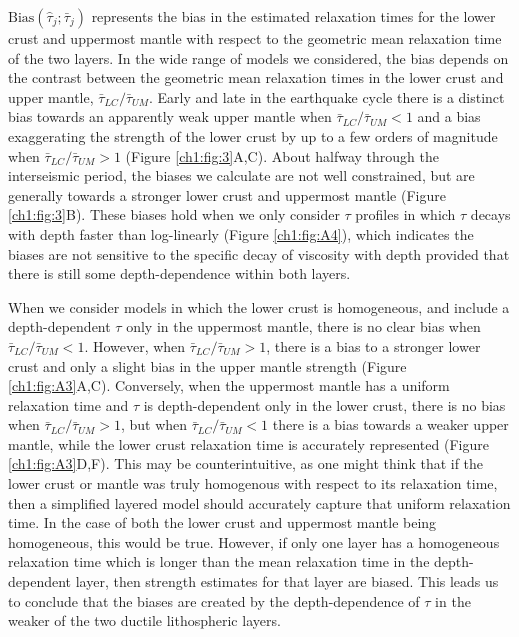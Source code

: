 $\mathrm{Bias}(\hat{\tau}_j; \bar{\tau}_j)$ represents the bias in the
estimated relaxation times for the lower crust and uppermost mantle
with respect to the geometric mean relaxation time of the two layers.
In the wide range of models we considered, the bias depends on the
contrast between the geometric mean relaxation times in the lower
crust and upper mantle, $\bar{\tau}_{LC} /\bar{\tau}_{UM}$.  Early and
late in the earthquake cycle there is a distinct bias towards an
apparently weak upper mantle when $\bar{\tau}_{LC} / \bar{\tau}_{UM} <
1$ and a bias exaggerating the strength of the lower crust by up to a
few orders of magnitude when $\bar{\tau}_{LC} / \bar{\tau}_{UM} > 1$
(Figure \ref{ch1:fig:3}A,C).  About halfway through the interseismic
period, the biases we calculate are not well constrained, but are
generally towards a stronger lower crust and uppermost mantle (Figure
\ref{ch1:fig:3}B). These biases hold when we only consider $\tau$
profiles in which $\tau$ decays with depth faster than log-linearly
(Figure \ref{ch1:fig:A4}), which indicates the biases are not sensitive to
the specific decay of viscosity with depth provided that there is
still some depth-dependence within both layers.

When we consider models in which the lower crust is homogeneous, and
include a depth-dependent $\tau$ only in the uppermost mantle, there
is no clear bias when $\bar{\tau}_{LC} / \bar{\tau}_{UM} < 1$.
However, when $\bar{\tau}_{LC} / \bar{\tau}_{UM} > 1$, there is a bias
to a stronger lower crust and only a slight bias in the upper mantle
strength (Figure \ref{ch1:fig:A3}A,C).  Conversely, when the
uppermost mantle has a uniform relaxation time and $\tau$ is
depth-dependent only in the lower crust, there is no bias when
$\bar{\tau}_{LC} / \bar{\tau}_{UM} > 1$, but when $\bar{\tau}_{LC} /
\bar{\tau}_{UM} < 1$ there is a bias towards a weaker upper mantle,
while the lower crust relaxation time is accurately represented
(Figure \ref{ch1:fig:A3}D,F). This may be counterintuitive, as one might
think that if the lower crust or mantle was truly homogenous with
respect to its relaxation time, then a simplified layered model should
accurately capture that uniform relaxation time. In the case of both
the lower crust and uppermost mantle being homogeneous, this would be
true. However, if only one layer has a homogeneous relaxation time
which is longer than the mean relaxation time in the depth-dependent
layer, then strength estimates for that layer are biased.  This leads
us to conclude that the biases are created by the depth-dependence of
$\tau$ in the weaker of the two ductile lithospheric layers.

